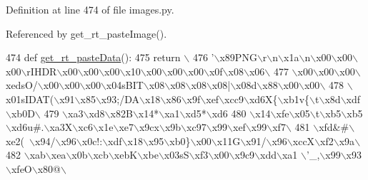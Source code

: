 Definition at line 474 of file images.\+py.



Referenced by get\+\_\+rt\+\_\+paste\+Image().


\begin{DoxyCode}
474 \textcolor{keyword}{def }\hyperlink{namespaceimages_add410f080839e1241e8a9c07e2d46490}{get\_rt\_pasteData}():
475     \textcolor{keywordflow}{return} \(\backslash\)
476 \textcolor{stringliteral}{'\(\backslash\)x89PNG\(\backslash\)r\(\backslash\)n\(\backslash\)x1a\(\backslash\)n\(\backslash\)x00\(\backslash\)x00\(\backslash\)x00\(\backslash\)rIHDR\(\backslash\)x00\(\backslash\)x00\(\backslash\)x00\(\backslash\)x10\(\backslash\)x00\(\backslash\)x00\(\backslash\)x00\(\backslash\)x0f\(\backslash\)x08\(\backslash\)x06\(\backslash\)}
477 \textcolor{stringliteral}{\(\backslash\)x00\(\backslash\)x00\(\backslash\)x00\(\backslash\)xedsO/\(\backslash\)x00\(\backslash\)x00\(\backslash\)x00\(\backslash\)x04sBIT\(\backslash\)x08\(\backslash\)x08\(\backslash\)x08\(\backslash\)x08|\(\backslash\)x08d\(\backslash\)x88\(\backslash\)x00\(\backslash\)x00\(\backslash\)}
478 \textcolor{stringliteral}{\(\backslash\)x01sIDAT(\(\backslash\)x91\(\backslash\)x85\(\backslash\)x93;/DA\(\backslash\)x18\(\backslash\)x86\(\backslash\)x9f\(\backslash\)xef\(\backslash\)xcc9\(\backslash\)xd6X\{\(\backslash\)xb1v\{\(\backslash\)t\(\backslash\)x8d\(\backslash\)xdf\(\backslash\)xb0D\(\backslash\)}
479 \textcolor{stringliteral}{\(\backslash\)xa3\(\backslash\)xd8\(\backslash\)x82B\(\backslash\)x14*\(\backslash\)xa1\(\backslash\)xd5*\(\backslash\)xd6%
480 \textcolor{stringliteral}{\(\backslash\)x14\(\backslash\)xfe\(\backslash\)x05\(\backslash\)t\(\backslash\)xb5\(\backslash\)xb5\(\backslash\)xd6u#.\(\backslash\)xa3X\(\backslash\)xc6\(\backslash\)x1e\(\backslash\)xe7\(\backslash\)x9cx\(\backslash\)x9b\(\backslash\)xc97\(\backslash\)x99\(\backslash\)xef\(\backslash\)x99\(\backslash\)xf7\(\backslash\)}
481 \textcolor{stringliteral}{\(\backslash\)xfd&#\(\backslash\)xe2(~\(\backslash\)x94/\(\backslash\)x96\(\backslash\)x0c!:\(\backslash\)xdf\(\backslash\)x18\(\backslash\)x95\(\backslash\)xb0\}\(\backslash\)x00\(\backslash\)x11G\(\backslash\)x91/\(\backslash\)x96\(\backslash\)xccX\(\backslash\)xf2\(\backslash\)x9a\(\backslash\)}
482 \textcolor{stringliteral}{\(\backslash\)xab\(\backslash\)xea\(\backslash\)x0b\(\backslash\)xcb\(\backslash\)xebK\(\backslash\)xbe\(\backslash\)x03sS\(\backslash\)xf3\(\backslash\)x00\(\backslash\)x9c9\(\backslash\)xdd\(\backslash\)xa1 \(\backslash\)'\_,\(\backslash\)x99\(\backslash\)x93\(\backslash\)xfeO\(\backslash\)x80@\(\backslash\)}
}
\end{DoxyCode}
